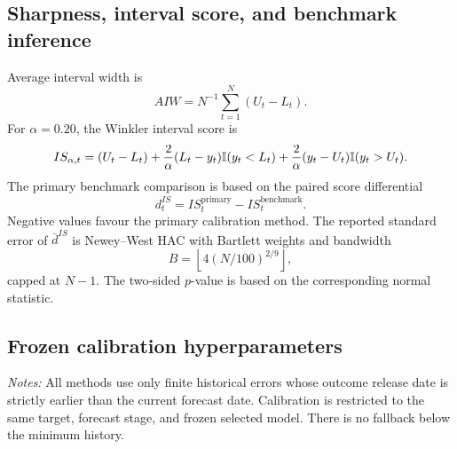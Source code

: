 \subsection{Sharpness, interval score, and benchmark inference}

Average interval width is
\[
    AIW=N^{-1}\sum_{t=1}^{N}(U_t-L_t).
\]
For \(\alpha=0.20\), the Winkler interval score is
\[
    IS_{\alpha,t}
    =
    (U_t-L_t)
    +\frac{2}{\alpha}(L_t-y_t)\mathbb{I}(y_t<L_t)
    +\frac{2}{\alpha}(y_t-U_t)\mathbb{I}(y_t>U_t).
\]
The primary benchmark comparison is based on the paired score differential
\[
    d_t^{IS}
    =
    IS_t^{\mathrm{primary}}
    -
    IS_t^{\mathrm{benchmark}}.
\]
Negative values favour the primary calibration method.  The reported
standard error of \(\bar d^{IS}\) is Newey--West HAC with Bartlett weights
and bandwidth
\[
    B
    =
    \left\lfloor
        4(N/100)^{2/9}
    \right\rfloor,
\]
capped at \(N-1\).  The two-sided \(p\)-value is based on the corresponding
normal statistic.

\subsection{Frozen calibration hyperparameters}

\begin{table}[H]
\centering
\caption{Frozen H4 interval-calibration specification}
\label{tab:h4_hyperparameters}
\small
{}
\par\medskip
\begin{minipage}{0.94\textwidth}
\footnotesize
\textit{Notes:} All methods use only finite historical errors whose outcome
release date is strictly earlier than the current forecast date.  Calibration
is restricted to the same target, forecast stage, and frozen selected model.
There is no fallback below the minimum history.
\end{minipage}
\end{table}
